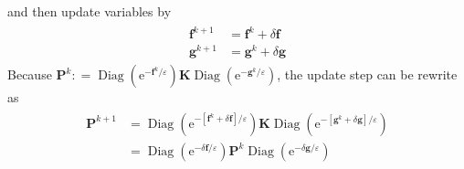 \documentclass{article}
\begin{document}
and then update variables by
\begin{align}
\begin{aligned}  \mathbf {f} ^ { k + 1 } & =  \mathbf {f} ^ { k } + \delta  \mathbf {f} \\  \mathbf {g} ^ { k + 1 } & =  \mathbf {g} ^ { k } + \delta  \mathbf {g} \end{aligned}
\end{align}
Because $ \mathbf {P} ^ { k } : = \operatorname { Diag } \left( \mathrm { e } ^ { -  \mathbf {f} ^ { k } / \varepsilon } \right) \mathbf { K} \operatorname { Diag } \left( \mathrm { e } ^ { -  \mathbf {g} ^ { k } / \varepsilon } \right)$, the update step can be rewrite as
\begin{align}
\begin{aligned}  \mathbf {P} ^ { k + 1 } & = \operatorname { Diag } \left( \mathrm { e } ^ { - \left[  \mathbf {f} ^ { k } + \delta  \mathbf {f} \right] / \varepsilon } \right)  \mathbf {K} \operatorname { Diag } \left( \mathrm { e } ^ { - \left[  \mathbf {g} ^ { k } + \delta  \mathbf {g} \right] / \varepsilon } \right) \\ & = \operatorname { Diag } \left( \mathrm { e } ^ { - \delta  \mathbf {f} / \varepsilon } \right)  \mathbf {P} ^ { k } \operatorname { Diag } \left( \mathrm { e } ^ { - \delta  \mathbf {g} / \varepsilon } \right) \end{aligned}
\end{align}
\end{document}
